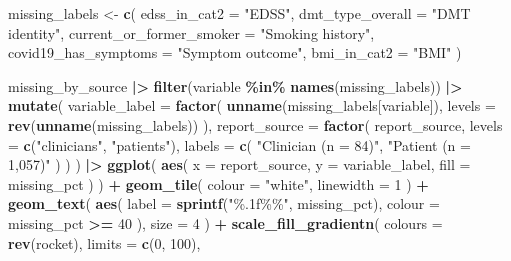 \documentclass[
  british,
]{article}
\newenvironment{Shaded}{\begin{snugshade}}{\end{snugshade}}
\newcommand{\AttributeTok}[1]{\textcolor[rgb]{0.13,0.29,0.53}{#1}}
\newcommand{\DecValTok}[1]{\textcolor[rgb]{0.00,0.00,0.81}{#1}}
\newcommand{\FunctionTok}[1]{\textcolor[rgb]{0.13,0.29,0.53}{\textbf{#1}}}
\newcommand{\NormalTok}[1]{#1}
\newcommand{\OtherTok}[1]{\textcolor[rgb]{0.56,0.35,0.01}{#1}}
\newcommand{\SpecialCharTok}[1]{\textcolor[rgb]{0.81,0.36,0.00}{\textbf{#1}}}
\newcommand{\StringTok}[1]{\textcolor[rgb]{0.31,0.60,0.02}{#1}}
\begin{document}
\begin{Shaded}
\begin{Highlighting}[]
\NormalTok{missing\_labels }\OtherTok{\textless{}{-}} \FunctionTok{c}\NormalTok{(}
  \AttributeTok{edss\_in\_cat2 =} \StringTok{"EDSS"}\NormalTok{,}
  \AttributeTok{dmt\_type\_overall =} \StringTok{"DMT identity"}\NormalTok{,}
  \AttributeTok{current\_or\_former\_smoker =} \StringTok{"Smoking history"}\NormalTok{,}
  \AttributeTok{covid19\_has\_symptoms =} \StringTok{"Symptom outcome"}\NormalTok{,}
  \AttributeTok{bmi\_in\_cat2 =} \StringTok{"BMI"}
\NormalTok{)}

\NormalTok{missing\_by\_source }\SpecialCharTok{|\textgreater{}}
  \FunctionTok{filter}\NormalTok{(variable }\SpecialCharTok{\%in\%} \FunctionTok{names}\NormalTok{(missing\_labels)) }\SpecialCharTok{|\textgreater{}}
  \FunctionTok{mutate}\NormalTok{(}
    \AttributeTok{variable\_label =} \FunctionTok{factor}\NormalTok{(}
      \FunctionTok{unname}\NormalTok{(missing\_labels[variable]),}
      \AttributeTok{levels =} \FunctionTok{rev}\NormalTok{(}\FunctionTok{unname}\NormalTok{(missing\_labels))}
\NormalTok{    ),}
    \AttributeTok{report\_source =} \FunctionTok{factor}\NormalTok{(}
\NormalTok{      report\_source,}
      \AttributeTok{levels =} \FunctionTok{c}\NormalTok{(}\StringTok{"clinicians"}\NormalTok{, }\StringTok{"patients"}\NormalTok{),}
      \AttributeTok{labels =} \FunctionTok{c}\NormalTok{(}
        \StringTok{"Clinician (n = 84)"}\NormalTok{,}
        \StringTok{"Patient (n = 1,057)"}
\NormalTok{      )}
\NormalTok{    )}
\NormalTok{  ) }\SpecialCharTok{|\textgreater{}}
  \FunctionTok{ggplot}\NormalTok{(}
    \FunctionTok{aes}\NormalTok{(}
      \AttributeTok{x =}\NormalTok{ report\_source,}
      \AttributeTok{y =}\NormalTok{ variable\_label,}
      \AttributeTok{fill =}\NormalTok{ missing\_pct}
\NormalTok{    )}
\NormalTok{  ) }\SpecialCharTok{+}
  \FunctionTok{geom\_tile}\NormalTok{(}
    \AttributeTok{colour =} \StringTok{"white"}\NormalTok{,}
    \AttributeTok{linewidth =} \DecValTok{1}
\NormalTok{  ) }\SpecialCharTok{+}
  \FunctionTok{geom\_text}\NormalTok{(}
    \FunctionTok{aes}\NormalTok{(}
      \AttributeTok{label =} \FunctionTok{sprintf}\NormalTok{(}\StringTok{"\%.1f\%\%"}\NormalTok{, missing\_pct),}
      \AttributeTok{colour =}\NormalTok{ missing\_pct }\SpecialCharTok{\textgreater{}=} \DecValTok{40}
\NormalTok{    ),}
    \AttributeTok{size =} \DecValTok{4}
\NormalTok{  ) }\SpecialCharTok{+}
  \FunctionTok{scale\_fill\_gradientn}\NormalTok{(}
    \AttributeTok{colours =} \FunctionTok{rev}\NormalTok{(rocket),}
    \AttributeTok{limits =} \FunctionTok{c}\NormalTok{(}\DecValTok{0}\NormalTok{, }\DecValTok{100}\NormalTok{),}

\end{Highlighting}
\end{Shaded}
\end{document}
